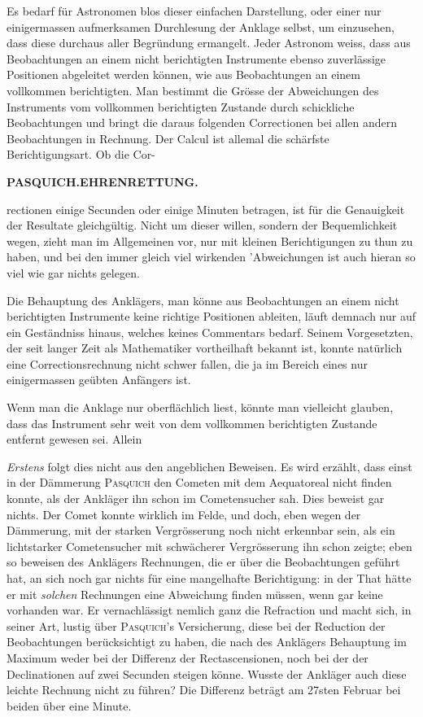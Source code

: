 Es bedarf für Astronomen blos dieser einfachen Darstellung, oder einer nur einigermassen aufmerksamen Durchlesung der Anklage selbst, um einzusehen, dass diese durchaus aller Begründung ermangelt. Jeder Astronom weiss, dass aus Beobachtungen an einem nicht berichtigten Instrumente ebenso zuverlässige Positionen abgeleitet werden können, wie aus Beobachtungen an einem vollkommen berichtigten. Man bestimmt die Grösse der Abweichungen des Instruments vom vollkommen berichtigten Zustande durch schickliche Beobachtungen und bringt die daraus folgenden Correctionen bei allen andern Beobachtungen in Rechnung. Der Calcul ist allemal die schärfste Berichtigungsart. Ob die Cor-\par
\clearpage
\thispagestyle{empty}
\noindent{}%
\makebox[12mm][l]{}%
\parbox[t]{\dimexpr\linewidth-24mm\relax}{\centering\footnotesize\bfseries PASQUICH.\enspace EHRENRETTUNG.\par}%
\par\medskip
\noindent rectionen einige Secunden oder einige Minuten betragen, ist für die Ge\-nauigkeit der Resultate gleichgültig. Nicht um dieser willen, sondern der Bequemlichkeit wegen, zieht man im Allgemeinen vor, nur mit kleinen Berichtigungen zu thun zu haben, und bei den immer gleich viel wirkenden 'Abweichungen ist auch hieran so viel wie gar nichts gelegen.

Die Behauptung des Anklägers, man könne aus Beobachtungen an einem nicht berichtigten Instrumente keine richtige Positionen ableiten, läuft demnach nur auf ein Geständniss hinaus, welches keines Commentars bedarf. Seinem Vorgesetzten, der seit langer Zeit als Mathematiker vortheilhaft bekannt ist, konnte natürlich eine Correctionsrechnung nicht schwer fallen, die ja im Bereich eines nur einigermassen geübten Anfängers ist.

Wenn man die Anklage nur oberflächlich liest, könnte man vielleicht glauben, dass das Instrument sehr weit von dem vollkommen berichtigten Zustande entfernt gewesen sei. Allein

\emph{Erstens} folgt dies nicht aus den angeblichen Beweisen. Es wird erzählt, dass einst in der Dämmerung \textsc{Pasquich} den Cometen mit dem Aequatoreal nicht finden konnte, als der Ankläger ihn schon im Cometensucher sah. Dies beweist gar nichts. Der Comet konnte wirklich im Felde, und doch, eben wegen der Dämmerung, mit der starken Vergrösserung noch nicht erkennbar sein, als ein lichtstarker Cometensucher mit schwächerer Vergrösserung ihn schon zeigte; eben so beweisen des Anklägers Rechnungen, die er über die Beobachtungen geführt hat, an sich noch gar nichts für eine mangelhafte Berichtigung: in der That hätte er mit \emph{solchen} Rechnungen eine Abweichung finden müssen, wenn gar keine vorhanden war. Er vernachlässigt nemlich ganz die Refraction und macht sich, in seiner Art, lustig über \textsc{Pasquich}'s Versicherung, diese bei der Reduction der Beobachtungen berücksichtigt zu haben, die nach des Anklägers Behauptung im Maximum weder bei der Differenz der Rectascensionen, noch bei der der Declinationen auf zwei Secunden steigen könne. Wusste der Ankläger auch diese leichte Rechnung nicht zu führen? Die Differenz beträgt am 27sten Februar bei beiden über eine Minute.

